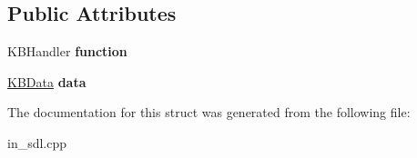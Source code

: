 \subsection*{Public Attributes}
\begin{DoxyCompactItemize}
\item 
K\+B\+Handler {\bfseries function}\hypertarget{structJSHandlerCall_a7a1bc8e1b85c1e59af04de790289b0e3}{}\label{structJSHandlerCall_a7a1bc8e1b85c1e59af04de790289b0e3}

\item 
\hyperlink{classKBData}{K\+B\+Data} {\bfseries data}\hypertarget{structJSHandlerCall_addfbd01a933145a6847ca0ee2c8f01b6}{}\label{structJSHandlerCall_addfbd01a933145a6847ca0ee2c8f01b6}

\end{DoxyCompactItemize}


The documentation for this struct was generated from the following file\+:\begin{DoxyCompactItemize}
\item 
in\+\_\+sdl.\+cpp\end{DoxyCompactItemize}
